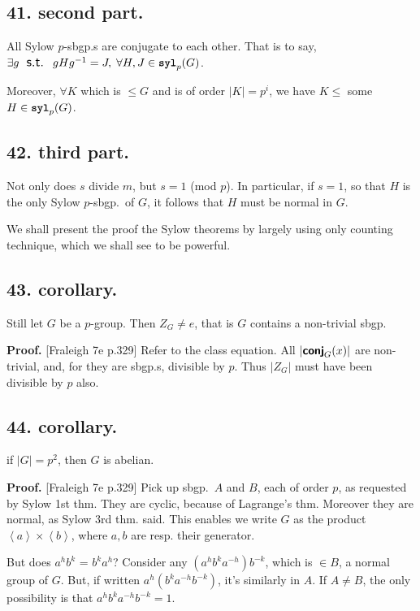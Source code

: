 \documentclass[12pt]{article}
\newcommand\X\times%
\newcommand\Ev\forall%
\newcommand\Ex\exists%
\newcommand\St{\textsf{\large \: s.t. \:}}%
\newcommand{\Ab}[1]{ \left\langle #1 \right\rangle } %
\newcommand{\Ss}[1]{\textsf{\textbf{#1}}}%
\newcommand{\Tw}[1]{\texttt{\textbf{#1}}}%
\begin{document}
\subsection*{41. second part.} All Sylow \(p\)-sbgp.s are conjugate to each other. 
That is to say, \(\Ex g \St g H g^{-1} = J,\; \Ev H, J \in \Tw{syl}_p(G)\). \par
Moreover, \(\Ev K\) which is \(\leq G\) and is of order \(|K| = p^i\), 
we have \(K \leq\) some \(H \in \Tw{syl}_p(G)\). \par

\subsection*{42. third part.} Not only does \(s\) divide \(m\), but \(s =1\) (mod \(p\)). 
In particular, if \(s =1\), so that \(H\) is the only Sylow \(p\)-sbgp.\ of \(G\), 
it follows that \(H\) must be normal in \(G\). \par
We shall present the proof the Sylow theorems by largely using only counting technique, which we shall see to be powerful. 

\subsection*{43. corollary.} Still let \(G\) be a \(p\)-group. 
Then \(Z_G \neq {e}\), that is \(G\) contains a non-trivial sbgp. \par
\Ss{Proof.} [Fraleigh 7e p.329] Refer to the class equation. 
All \(|\Ss{conj}_G (x)|\) are non-trivial, and, for they are sbgp.s, divisible by \(p\). 
Thus \(|Z_G|\) must have been divisible by \(p\) also.

\subsection*{44. corollary.} if \(|G| = p^2\), then \(G\) is abelian. \par
\Ss{Proof.} [Fraleigh 7e p.329] Pick up sbgp.\ \(A\) and \(B\), each of order \(p\), as requested by Sylow 1st thm. 
They are cyclic, because of Lagrange's thm. 
Moreover they are normal, as Sylow 3rd thm. said. 
This enables we write \(G\) as the product \(\Ab{a} \X \Ab{b}\), where \(a, b\) are resp. their generator. \par
But does \(a^h b^k\) = \(b^k a^h\)? 
Consider any \((a^h b^k a^{-h}) b^{-k}\), which is \(\in B\), a normal group of \(G\). 
But, if written \(a^h (b^k a^{-h} b^{-k})\), it's similarly in \(A\). 
If \(A \neq B\), the only possibility is that \(a^h b^k a^{-h} b^{-k} = 1\). 
\end{document}
